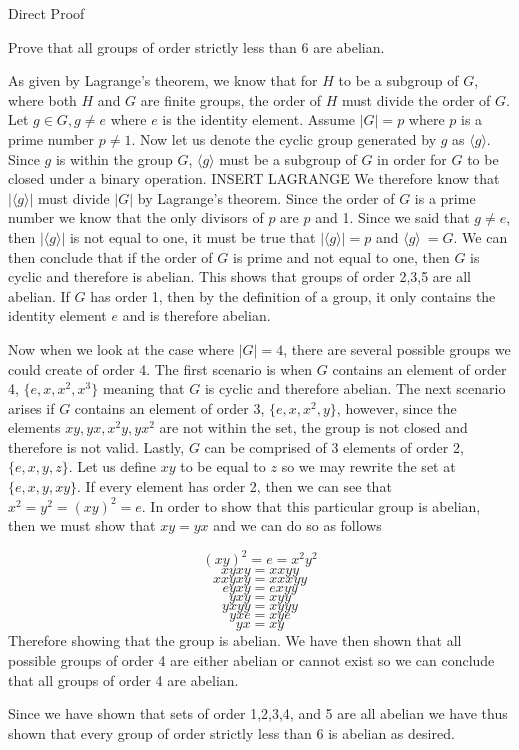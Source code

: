 Direct Proof

Prove that all groups of order strictly less than $6$ are abelian.

\begin{solution}
As given by Lagrange's theorem, we know that for $H$ to be a subgroup of $G$, where both $H$ and $G$ are finite groups, the order of $H$ must divide the order of $G$. Let $g\in G, g \neq e$ where $e$ is the identity element. Assume $|G| = p$ where $p$ is a prime number $p \neq 1$. Now let us denote the cyclic group generated by $g$ as $\langle g \rangle$. Since $g$ is within the group $G$, $\langle g \rangle$ must be a subgroup of $G$ in order for $G$ to be closed under a binary operation. INSERT LAGRANGE We therefore know that $|\langle g \rangle|$ must divide $|G|$ by Lagrange's theorem. Since the order of $G$ is a prime number we know that the only divisors of $p$ are $p$ and 1. Since we said that $ g \neq e$, then $|\langle g \rangle|$ is not equal to one, it must be true that $|\langle g \rangle| = p$ and $\langle g \rangle \ = G$. We can then conclude that if the order of $G$ is prime and not equal to one, then $G$ is cyclic and therefore is abelian. This shows that groups of order 2,3,5 are all abelian. If $G$ has order 1, then by the definition of a group, it only contains the identity element $e$ and is therefore abelian. 


Now when we look at the case where $|G| = 4$, there are several possible groups we could create of order 4. The first scenario is when $G$ contains an element of order 4, $\{ e, x, x^2, x^3 \}$ meaning that $G$ is cyclic and therefore abelian. The next scenario arises if $G$ contains an element of order 3, $\{ e, x, x^2, y \}$, however, since the elements $xy, yx, x^2y, yx^2$ are not within the set, the group is not closed and therefore is not valid. Lastly, $G$ can be comprised of 3 elements of order 2, $\{ e, x, y, z \}$. Let us define $xy$ to be equal to $z$ so we may rewrite the set at $\{ e, x, y, xy \}$. If every element has order 2, then we can see that $x^2 = y^2 = (xy)^2 = e$. In order to show that this particular group is abelian, then we must show that $xy = yx$ and we can do so as follows

$$(xy)^2  = e = x^2y^2$$
$$ xyxy=xxyy$$
$$ xxyxy =xxxyy$$
$$ eyxy = exyy$$
$$ yxy = xyy$$
$$ yxyy = xyyy$$
$$ yxe = xye$$
$$yx = xy $$
Therefore showing that the group is abelian. We have then shown that all possible groups of order 4 are either abelian or cannot exist so we can conclude that all groups of order 4 are abelian.

Since we have shown that sets of order 1,2,3,4, and 5 are all abelian we have thus shown that every group of order strictly less than $6$ is abelian as desired.
\end{solution}